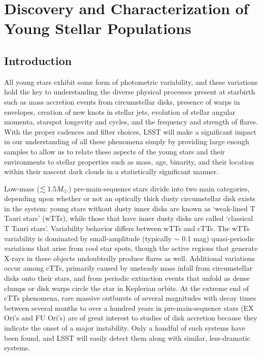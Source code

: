 
\section{Discovery and Characterization of Young Stellar Populations}
\def\secname{youngstars}\label{sec:\secname}


\subsection{Introduction}

All young stars exhibit some form of 
photometric variability, and these variations hold the key
to understanding the diverse physical processes present at starbirth
such as mass accretion events from circumstellar disks, presence of
warps in envelopes, creation of new knots in stellar jets,
evolution of stellar angular momenta, starspot longevity and cycles, 
and the frequency and strength of flares. 
With the proper cadences and filter choices,
LSST will make a significant impact in our understanding of all
these phenomena simply by providing large enough samples to allow
us to relate these aspects of the young stars and their environments
to stellar properties such as mass, age, binarity,
and their location within their nascent dark clouds in a statistically
significant manner.

Low-mass ($\lesssim 1.5 M_{\odot}$) pre-main-sequence stars divide
into two main categories, depending upon whether or not an optically thick
dusty circumstellar disk exists in the system: young stars without dusty
inner disks are known as `weak-lined T Tauri stars' (wTTs), while those
that have inner dusty disks are called `classical T Tauri stars'. Variability
behavior differs between wTTs and cTTs. The wTTs variability is dominated by
small-amplitude (typically $\sim$ 0.1 mag) quasi-periodic variations that arise
from cool star spots, though the active regions that generate X-rays in
these objects undoubtedly produce flares as well. Additional variations occur
among cTTs, primarily caused by unsteady mass infall from circumstellar disks
onto their stars, and from periodic extinction events that unfold as dense
clumps or disk warps circle the star in Keplerian orbits. 
At the extreme end of cTTs phenomena, rare
massive outbursts of several magnitudes with decay times between several months
to over a hundred years in pre-main-sequence stars (EX Ori's and FU Ori's)
are of great interest to studies of disk accretion because they indicate the onset of
a major instability. Only a handful of such systems have been found, and LSST
will easily detect them along with similar, less-dramatic systems.

